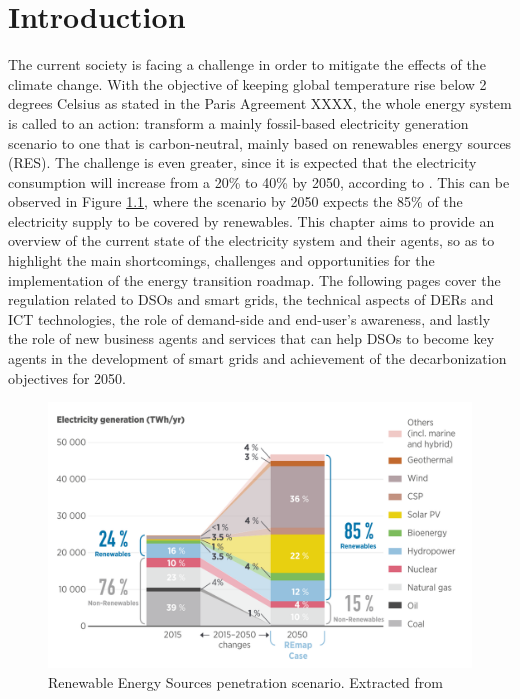 \renewcommand\labelenumi{(\roman{enumi})}
\renewcommand\theenumi\labelenumi

\chapter{Introduction}
\label{chapterIntro}

The current society is facing a challenge in order to mitigate the effects of the climate change. With the objective of keeping global temperature rise below 2 degrees Celsius as stated in the Paris Agreement XXXX, the whole energy system is called to an action: transform a mainly fossil-based electricity generation scenario to one that is carbon-neutral, mainly based on renewables energy sources (RES). The challenge is even greater, since it is expected that the electricity consumption will increase from a 20\% to 40\% by 2050, according to \cite{IRENA2018}. This can be observed in Figure \ref{fig:scenarios}, where the scenario by 2050 expects the 85\% of the electricity supply to be covered by renewables. This chapter aims to provide an overview of the current state of the electricity system and their agents, so as to highlight the main shortcomings, challenges and opportunities for the implementation of the energy transition roadmap. The following pages cover the regulation related to DSOs and smart grids, the technical aspects of DERs and ICT technologies, the role of demand-side and end-user's awareness, and lastly the role of new business agents and services that can help DSOs to become key agents in the development of smart grids and achievement of the decarbonization objectives for 2050. 


\begin{figure}[]
	\centering 
	\includegraphics[width=0.8\columnwidth ]{ChapterIntro/Figures/irena_scenarios.png}
		\caption{Renewable Energy Sources penetration scenario. Extracted from \cite{IRENA2018}}  
		\label{fig:scenarios}
\end{figure}


